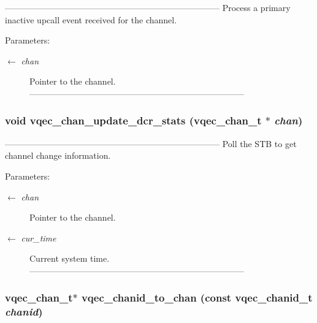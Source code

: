 --------------------------------------------------------------------------- Process a primary inactive upcall event received for the channel.

\begin{Desc}
\item[Parameters:]
\begin{description}
\item[\mbox{$\leftarrow$} {\em chan}]Pointer to the channel. --------------------------------------------------------------------------- \end{description}
\end{Desc}
\subsubsection{\setlength{\rightskip}{0pt plus 5cm}void vqec\_\-chan\_\-update\_\-dcr\_\-stats (\bf{vqec\_\-chan\_\-t} $\ast$ {\em chan})}\label{vqec__channel__private_8h_433bc9ab3ed1e72c0acc26ab3847e387}


--------------------------------------------------------------------------- Poll the STB to get channel change information.

\begin{Desc}
\item[Parameters:]
\begin{description}
\item[\mbox{$\leftarrow$} {\em chan}]Pointer to the channel. \item[\mbox{$\leftarrow$} {\em cur\_\-time}]Current system time. --------------------------------------------------------------------------- \end{description}
\end{Desc}
\subsubsection{\setlength{\rightskip}{0pt plus 5cm}\bf{vqec\_\-chan\_\-t}$\ast$ vqec\_\-chanid\_\-to\_\-chan (const \bf{vqec\_\-chanid\_\-t} {\em chanid})}\label{vqec__channel__private_8h_280869744e24992f36392215ccc3bb98}


